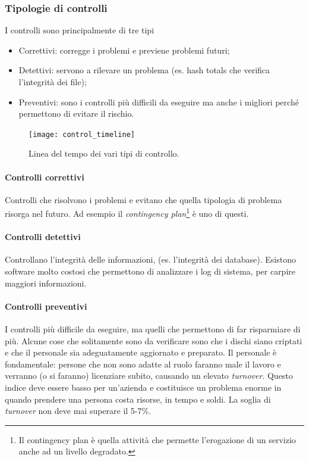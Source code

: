 \subsubsection{Tipologie di controlli}

I controlli sono principalmente di tre tipi
\begin{itemize}
\item Correttivi: corregge i problemi e previene problemi futuri;
\item Detettivi: servono a rilevare un problema (es. hash totals che 
verifica l'integrità dei file);
\item Preventivi: sono i controlli più difficili da eseguire ma anche 
i migliori perché permettono di evitare il rischio.
\end{itemize}

\begin{figure}[H]
	\begin{center}	
\texttt{[image: control\_timeline]}
	\end{center}
	\caption{Linea del tempo dei vari tipi di controllo.}
\end{figure}

\paragraph*{Controlli correttivi} Controlli che risolvono i problemi e 
evitano che quella tipologia di problema risorga nel futuro. Ad esempio il 
\textit{contingency plan}\footnote{Il contingency plan è quella 
attività che permette l'erogazione di un servizio anche ad un livello 
degradato.} è uno di questi.

\paragraph*{Controlli detettivi} Controllano l'integrità delle 
informazioni, (es. l'integrità dei database). Esistono software 
molto costosi che permettono di analizzare i log di sistema, per carpire 
maggiori informazioni.

\paragraph*{Controlli preventivi} I controlli più difficile da eseguire, ma 
quelli che permettono di far risparmiare di più. Alcune cose che solitamente 
sono da verificare sono che i dischi siano criptati e che il 
personale sia adeguatamente aggiornato e preparato.
Il personale è fondamentale: persone che non sono adatte al ruolo faranno male 
il lavoro e verranno (o si faranno) licenziare subito, causando un 
elevato \textit{turnover}. Questo indice deve essere basso per un'azienda e 
costituisce un problema enorme in quando prendere una persona costa risorse, in 
tempo e soldi. La soglia di \textit{turnover} non deve mai superare il 5-7\%.

